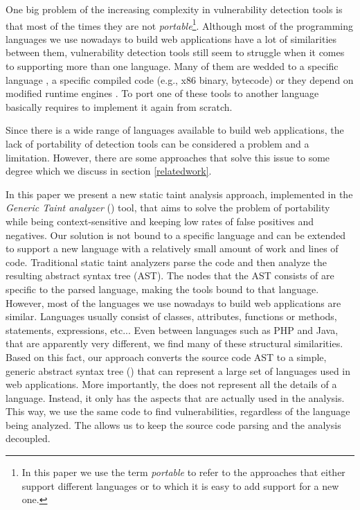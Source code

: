 One big problem of the increasing complexity in vulnerability detection tools is that most of the times they are not \textit{portable}\footnote{In this paper we use the term \textit{portable} to refer to the approaches that either support different languages or to which it is easy to add support for a new one.}. Although most of the programming languages we use nowadays to build web applications have a lot of similarities between them, vulnerability detection tools still seem to struggle when it comes to supporting more than one language. Many of them are wedded to a specific language \cite{diglossia,phpapis,jovanovic2006pixy, arzt2014flowdroid,nunes2015phpsafe,wassermann2008static, dahse2014simulation,livshits2005finding}, a specific compiled code \cite{dytan,taintcheck,dt++} (e.g., x86 binary, bytecode) or they depend on modified runtime engines \cite{diglossia,phosphor}. To port one of these tools to another language basically requires to implement it again from scratch.  

Since there is a wide range of languages available to build web applications, the lack of portability of detection tools can be considered a problem and a limitation. However, there are some approaches that solve this issue to some degree which we discuss in section \ref{relatedwork}. 

In this paper we present a new static taint analysis approach, implemented in the {\it Generic Taint analyzer} (\toolname{}) tool, that aims to solve the problem of portability while being context-sensitive and keeping low rates of false positives and negatives. Our solution is not bound to a specific language and can be extended to support a new language with a relatively small amount of work and lines of code. 
Traditional static taint analyzers parse the code and then analyze the resulting abstract syntax tree (AST). The nodes that the AST consists of are specific to the parsed language, making the tools bound to that language. However, most of the languages we use nowadays to build web applications are similar. Languages usually consist of classes, attributes, functions or methods, statements, expressions, etc... Even between languages such as PHP and Java, that are apparently very different, we find many of these structural similarities. Based on this fact, our approach converts the source code AST to a simple, generic abstract syntax tree (\astname{}) that can represent a large set of languages used in web applications. More importantly, the \astname{} does not represent all the details of a language. Instead, it only has the aspects that are actually used in the analysis. This way, we  use the same code to find vulnerabilities, regardless of the language being analyzed. The \astname{} allows us to keep the source code parsing and the analysis decoupled.

